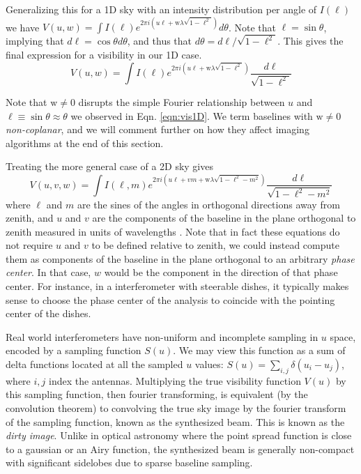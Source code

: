 Generalizing this for a 1D sky with an intensity distribution per angle of $I(\ell)$ we have $V(u,w)=\int I(\ell)e^{2\pi i (u\ell+\text{w}\lambda\sqrt{1-\ell^2})}d\theta$. Note that $\ell=\sin\theta$, implying that $d\ell=\cos\theta d\theta$, and thus that $d\theta=d\ell/\sqrt{1-\ell^2}$. This gives the final expression for a visibility in our 1D case.
\begin{equation}
V(u,w)=\int I(\ell)e^{2\pi i (u\ell+\text{w}\lambda\sqrt{1-\ell^2})}\frac{d\ell}{\sqrt{1-\ell^2}}
\end{equation}

Note that $\text{w}\neq0$ disrupts the simple Fourier relationship between $u$ and $\ell\equiv\sin\theta\approx\theta$ we observed in Eqn. \ref{eqn:vis1D}. We term baselines with $\text{w}\neq0$ \textit{non-coplanar}, and we will comment further on how they affect imaging algorithms at the end of this section.

Treating the more general case of a 2D sky gives 
\begin{equation}
V(u,v,w)=\int I(\ell,m)e^{2\pi i (u\ell+vm+\text{w}\lambda\sqrt{1-\ell^2-m^2})}\frac{d\ell}{\sqrt{1-\ell^2-m^2}}
\end{equation}
where $\ell$ and $m$ are the sines of the angles in orthogonal directions away from zenith, and $u$ and $v$ are the components of the baseline in the plane orthogonal to zenith measured in units of wavelengths \citep{thompsonmoranswenson}. Note that in fact these equations do not require $u$ and $v$ to be defined relative to zenith, we could instead compute them as components of the baseline in the plane orthogonal to an arbitrary \textit{phase center}. In that case, $w$ would be the component in the direction of that phase center. For instance, in a interferometer with steerable dishes, it typically makes sense to choose the phase center of the analysis to coincide with the pointing center of the dishes. 

Real world interferometers have non-uniform and incomplete sampling in $u$ space, encoded by a sampling function $S(u)$. We may view this function as a sum of delta functions located at all the sampled $u$ values: $S(u)=\sum_{i,j}\delta(u_i-u_j)$, where $i,j$ index the antennas. Multiplying the true visibility function $V(u)$ by this sampling function, then fourier transforming, is equivalent (by the convolution theorem) to convolving the true sky image by the fourier transform of the sampling function, known as the synthesized beam. This is known as the \textit{dirty image}. Unlike in optical astronomy where the point spread function is close to a gaussian or an Airy function, the synthesized beam is generally non-compact with significant sidelobes due to sparse baseline sampling.  

